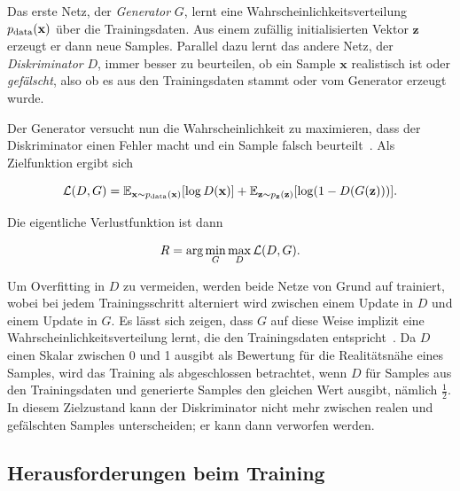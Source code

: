 Das erste Netz, der \emph{Generator} $ G $, lernt eine Wahrscheinlichkeitsverteilung $ p_{\textup{data}}(\mathbf{x}) $ über die Trainingsdaten.
Aus einem zufällig initialisierten Vektor $ \mathbf{z} $ erzeugt er dann neue Samples.
Parallel dazu lernt das andere Netz, der \emph{Diskriminator} $ D $, immer besser zu beurteilen, ob ein Sample $ \mathbf{x} $ realistisch ist oder \emph{gefälscht}, also ob es aus den Trainingsdaten stammt oder vom Generator erzeugt wurde.

Der Generator versucht nun die Wahrscheinlichkeit zu maximieren, dass der Diskriminator einen Fehler macht und ein Sample falsch beurteilt~\cite{Goodfellow.2014}.
Als Zielfunktion ergibt sich

\begin{equation}\label{eq:gan}
\mathcal{L}(D, G) = \mathbb{E}_{\mathbf{x} \sim p_{\textup{data}}(\mathbf{x})} [\log D(\mathbf{x})] + \mathbb{E}_{\mathbf{z} \sim p_{\mathbf{z}}(\mathbf{z})} [\log(1 - D(G(\mathbf{z})))].
\end{equation}

Die eigentliche Verlustfunktion ist dann

\begin{equation}\label{eq:ganrisk}
R = \textup{arg}\min_G \max_D \mathcal{L}(D, G).
\end{equation}

Um Overfitting in $ D $ zu vermeiden, werden beide Netze von Grund auf trainiert, wobei bei jedem Trainingsschritt alterniert wird zwischen einem Update in $ D $ und einem Update in $ G $.
Es lässt sich zeigen, dass $ G $ auf diese Weise implizit eine Wahrscheinlichkeitsverteilung lernt, die den Trainingsdaten entspricht~\cite{Goodfellow.2014}.
Da $ D $ einen Skalar zwischen 0 und 1 ausgibt als Bewertung für die Realitätsnähe eines Samples, wird das Training als abgeschlossen betrachtet, wenn $ D $ für Samples aus den Trainingsdaten und generierte Samples den gleichen Wert ausgibt, nämlich $ \frac{1}{2} $.
In diesem Zielzustand kann der Diskriminator nicht mehr zwischen realen und gefälschten Samples unterscheiden; er kann dann verworfen werden.



\subsection{Herausforderungen beim Training}

